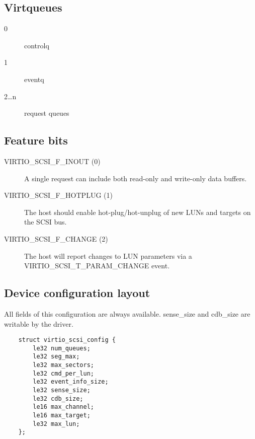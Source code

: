 \subsection{Virtqueues}\label{sec:Device Types / SCSI Host Device / Virtqueues}

\begin{description}
\item[0] controlq
\item[1] eventq
\item[2\ldots n] request queues
\end{description}

\subsection{Feature bits}\label{sec:Device Types / SCSI Host Device / Feature bits}

\begin{description}
\item[VIRTIO_SCSI_F_INOUT (0)] A single request can include both
    read-only and write-only data buffers.

\item[VIRTIO_SCSI_F_HOTPLUG (1)] The host should enable
    hot-plug/hot-unplug of new LUNs and targets on the SCSI bus.

\item[VIRTIO_SCSI_F_CHANGE (2)] The host will report changes to LUN
    parameters via a VIRTIO_SCSI_T_PARAM_CHANGE event.
\end{description}

\subsection{Device configuration layout}\label{sec:Device Types / SCSI Host Device / Device configuration layout}

  All fields of this configuration are always available. sense_size
  and cdb_size are writable by the driver.

\begin{lstlisting}
	struct virtio_scsi_config {
		le32 num_queues;
		le32 seg_max;
		le32 max_sectors;
		le32 cmd_per_lun;
		le32 event_info_size;
		le32 sense_size;
		le32 cdb_size;
		le16 max_channel;
		le16 max_target;
		le32 max_lun;
	};
\end{lstlisting}

